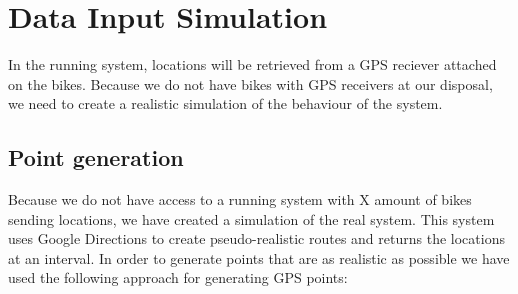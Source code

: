 
\section{Data Input Simulation}\label{design:datasimulation}
In the running system, locations will be retrieved from a GPS reciever attached on the bikes.
Because we do not have bikes with GPS receivers at our disposal, we need to create a realistic simulation of the behaviour of the system.

\subsection{Point generation}
Because we do not have access to a running system with X amount of bikes sending locations, we have created a simulation of the real system.
This system uses Google Directions to create pseudo-realistic routes and returns the locations at an interval.
In order to generate points that are as realistic as possible we have used the following approach for generating GPS points:

